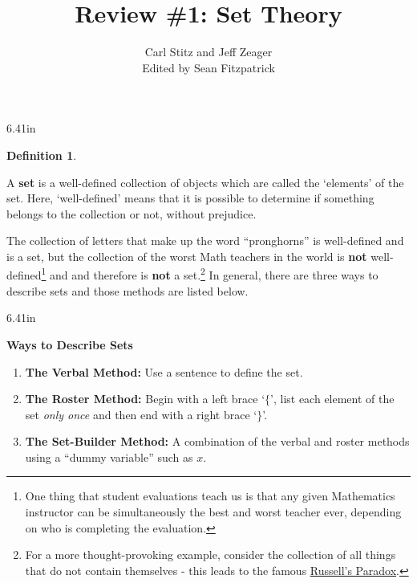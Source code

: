 \documentclass[11pt]{article}
\title{Review \#1: Set Theory}
\author{Carl Stitz and Jeff Zeager\\
Edited by Sean Fitzpatrick}
\theoremstyle{definition}  %
\newtheorem{defn}{\bf Definition}
\newcommand{\bbm}{\begin{boxedminipage}{6.41in}}
\newcommand{\ebm}{\end{boxedminipage}}
\begin{document}
\maketitle


\renewcommand{\headrulewidth}{0pt}
\renewcommand{\headheight}{14pt}
\lhead[\fancyplain{}{\sc\thepage}]%
      {\fancyplain{}{\sc \nouppercase{\rightmark}}}
\rhead[\fancyplain{}{\sc \nouppercase{\leftmark}}]%
      {\fancyplain{}{\sc\thepage}}
\cfoot{}


\medskip

\colorbox{ResultColor}{\bbm

\begin{defn} \label{setdef}

A \textbf{set} is a well-defined collection of objects which are called the `elements' of the set.  Here, `well-defined' means that it is possible to determine if something belongs to the collection or not, without prejudice. 

\end{defn}

\ebm}

\medskip

The collection of letters that make up the word ``pronghorns'' is well-defined and is a set, but the collection of the worst Math teachers in the world is \textbf{not} well-defined\footnote{One thing that student evaluations teach us is that any given Mathematics instructor can be simultaneously the best and worst teacher ever, depending on who is completing the evaluation.} and and therefore is \textbf{not} a set.\footnote{For a more thought-provoking example, consider the collection of all things that do not contain themselves - this leads to the famous \href{http://en.wikipedia.org/wiki/Russell's_paradox}{\underline{Russell's Paradox}}.}  In general, there are three ways to describe sets and those methods are listed below.


\medskip

 \label{waystodescribesets}

\colorbox{ResultColor}{\bbm

\centerline{\textbf{Ways to Describe Sets}}

\begin{enumerate}

\item \textbf{The Verbal Method:} Use a sentence to define the set.

\item \textbf{The Roster Method:}  Begin with a left brace `$\{$', list each element of the set \textit{only once} and then end with a right brace `$\}$'.

\item \textbf{The Set-Builder Method:} A combination of the verbal and roster methods using a ``dummy variable'' such as $x$.

\end{enumerate}

\ebm}
\end{document}
